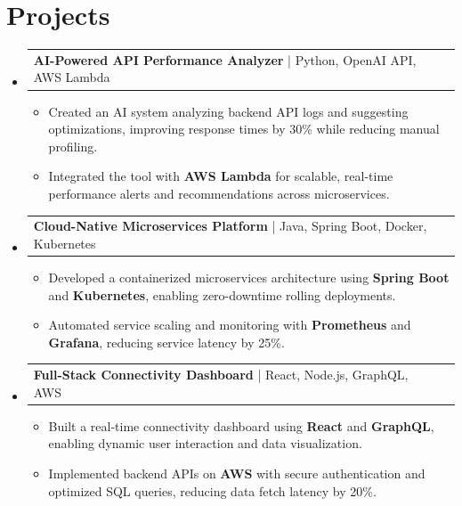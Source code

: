\documentclass[letterpaper,11pt]{article}
\makeatletter
\newcommand{\resumeItem}[1]{
  \item\footnotesize{
    {#1 \vspace{-2pt}}
  }
}
\newcommand{\resumeProjectHeading}[2]{
    \item
    \begin{tabular*}{1.001\textwidth}{l@{\extracolsep{\fill}}r}
      \small#1 & \textbf{\small #2}\\
    \end{tabular*}\vspace{-7pt}
}
\newcommand{\resumeSubHeadingListStart}{\begin{itemize}[leftmargin=0pt, label={}]}
\newcommand{\resumeSubHeadingListEnd}{\end{itemize}}
\newcommand{\resumeItemListStart}{\begin{itemize}[leftmargin=*]}
\newcommand{\resumeItemListEnd}{\end{itemize}\vspace{-5pt}}
\makeatother
\begin{document}
\section{Projects}
    \vspace{-5pt}
    \resumeSubHeadingListStart
      \resumeProjectHeading
          {\textbf{AI-Powered API Performance Analyzer} | Python, OpenAI API, AWS Lambda}{}
          \resumeItemListStart
              \resumeItem{Created an AI system analyzing backend API logs and suggesting optimizations, improving response times by 30\% while reducing manual profiling.}
              \resumeItem{Integrated the tool with \textbf{AWS Lambda} for scalable, real-time performance alerts and recommendations across microservices.}
          \resumeItemListEnd
          \vspace{-12pt}
      \resumeProjectHeading
          {\textbf{Cloud-Native Microservices Platform} | Java, Spring Boot, Docker, Kubernetes}{}
          \resumeItemListStart
              \resumeItem{Developed a containerized microservices architecture using \textbf{Spring Boot} and \textbf{Kubernetes}, enabling zero-downtime rolling deployments.}
              \resumeItem{Automated service scaling and monitoring with \textbf{Prometheus} and \textbf{Grafana}, reducing service latency by 25\%.}
          \resumeItemListEnd
          \vspace{-12pt}
      \resumeProjectHeading
          {\textbf{Full-Stack Connectivity Dashboard} | React, Node.js, GraphQL, AWS}{}
          \resumeItemListStart
              \resumeItem{Built a real-time connectivity dashboard using \textbf{React} and \textbf{GraphQL}, enabling dynamic user interaction and data visualization.}
              \resumeItem{Implemented backend APIs on \textbf{AWS} with secure authentication and optimized SQL queries, reducing data fetch latency by 20\%.}
          \resumeItemListEnd
    \resumeSubHeadingListEnd
\end{document}

